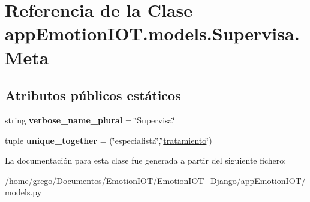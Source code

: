 \hypertarget{classappEmotionIOT_1_1models_1_1Supervisa_1_1Meta}{}\section{Referencia de la Clase app\+Emotion\+I\+O\+T.\+models.\+Supervisa.\+Meta}
\label{classappEmotionIOT_1_1models_1_1Supervisa_1_1Meta}
\subsection*{Atributos públicos estáticos}
\begin{DoxyCompactItemize}
\item 
string {\bfseries verbose\+\_\+name\+\_\+plural} = \char`\"{}Supervisa\char`\"{}\hypertarget{classappEmotionIOT_1_1models_1_1Supervisa_1_1Meta_a22a2e904ca0abe6f951fedd038be2dd7}{}\label{classappEmotionIOT_1_1models_1_1Supervisa_1_1Meta_a22a2e904ca0abe6f951fedd038be2dd7}

\item 
tuple {\bfseries unique\+\_\+together} = (\char`\"{}especialista\char`\"{},\char`\"{}\hyperlink{classappEmotionIOT_1_1models_1_1Supervisa_a923533a716f64694fee465a356069adb}{tratamiento}\char`\"{})\hypertarget{classappEmotionIOT_1_1models_1_1Supervisa_1_1Meta_ae921abecfb683987f4e8a4160fdc2ff6}{}\label{classappEmotionIOT_1_1models_1_1Supervisa_1_1Meta_ae921abecfb683987f4e8a4160fdc2ff6}

\end{DoxyCompactItemize}


La documentación para esta clase fue generada a partir del siguiente fichero\+:\begin{DoxyCompactItemize}
\item 
/home/grego/\+Documentos/\+Emotion\+I\+O\+T/\+Emotion\+I\+O\+T\+\_\+\+Django/app\+Emotion\+I\+O\+T/models.\+py\end{DoxyCompactItemize}
